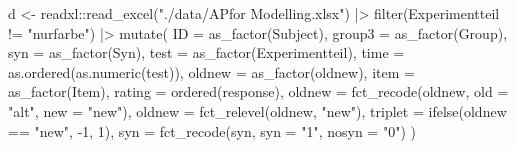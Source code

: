 \documentclass[
  man,floatsintext]{apa7}
\newenvironment{Shaded}{\begin{snugshade}}{\end{snugshade}}
\newcommand{\AttributeTok}[1]{\textcolor[rgb]{0.77,0.63,0.00}{#1}}
\newcommand{\DecValTok}[1]{\textcolor[rgb]{0.00,0.00,0.81}{#1}}
\newcommand{\FunctionTok}[1]{\textcolor[rgb]{0.00,0.00,0.00}{#1}}
\newcommand{\NormalTok}[1]{#1}
\newcommand{\OtherTok}[1]{\textcolor[rgb]{0.56,0.35,0.01}{#1}}
\newcommand{\SpecialCharTok}[1]{\textcolor[rgb]{0.00,0.00,0.00}{#1}}
\newcommand{\StringTok}[1]{\textcolor[rgb]{0.31,0.60,0.02}{#1}}
\begin{document}
\begin{Shaded}
\begin{Highlighting}[]
\NormalTok{d }\OtherTok{\textless{}{-}}\NormalTok{ readxl}\SpecialCharTok{::}\FunctionTok{read\_excel}\NormalTok{(}\StringTok{"./data/APfor Modelling.xlsx"}\NormalTok{) }\SpecialCharTok{|\textgreater{}}
  \FunctionTok{filter}\NormalTok{(Experimentteil }\SpecialCharTok{!=} \StringTok{"nurfarbe"}\NormalTok{) }\SpecialCharTok{|\textgreater{}}
  \FunctionTok{mutate}\NormalTok{(}
    \AttributeTok{ID =} \FunctionTok{as\_factor}\NormalTok{(Subject),}
    \AttributeTok{group3 =} \FunctionTok{as\_factor}\NormalTok{(Group),}
    \AttributeTok{syn =} \FunctionTok{as\_factor}\NormalTok{(Syn),}
    \AttributeTok{test =} \FunctionTok{as\_factor}\NormalTok{(Experimentteil),}
    \AttributeTok{time =} \FunctionTok{as.ordered}\NormalTok{(}\FunctionTok{as.numeric}\NormalTok{(test)),}
    \AttributeTok{oldnew =} \FunctionTok{as\_factor}\NormalTok{(oldnew),}
    \AttributeTok{item =} \FunctionTok{as\_factor}\NormalTok{(Item),}
    \AttributeTok{rating =} \FunctionTok{ordered}\NormalTok{(response),}
    \AttributeTok{oldnew =} \FunctionTok{fct\_recode}\NormalTok{(oldnew, }\AttributeTok{old =} \StringTok{"alt"}\NormalTok{, }\AttributeTok{new =} \StringTok{"new"}\NormalTok{),}
    \AttributeTok{oldnew =} \FunctionTok{fct\_relevel}\NormalTok{(oldnew, }\StringTok{"new"}\NormalTok{),}
    \AttributeTok{triplet =} \FunctionTok{ifelse}\NormalTok{(oldnew }\SpecialCharTok{==} \StringTok{"new"}\NormalTok{, }\SpecialCharTok{{-}}\DecValTok{1}\NormalTok{, }\DecValTok{1}\NormalTok{),}
    \AttributeTok{syn =} \FunctionTok{fct\_recode}\NormalTok{(syn, }\AttributeTok{syn =} \StringTok{"1"}\NormalTok{, }\AttributeTok{nosyn =} \StringTok{"0"}\NormalTok{)}
\NormalTok{  )}


\end{Highlighting}
\end{Shaded}
\end{document}
